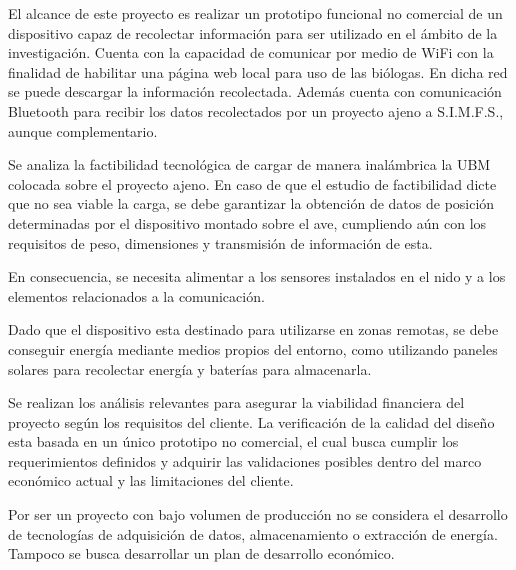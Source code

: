 El alcance de este proyecto es realizar un prototipo funcional no comercial de un dispositivo capaz de recolectar información para ser utilizado en el ámbito de la investigación. Cuenta con la capacidad de comunicar por medio de WiFi con la finalidad de habilitar una página web local para uso de las biólogas. En dicha red se puede descargar la información recolectada. Además cuenta con comunicación Bluetooth para recibir los datos recolectados por un proyecto ajeno a S.I.M.F.S., aunque complementario.

Se analiza la factibilidad tecnológica de cargar de manera inalámbrica la UBM colocada sobre el proyecto ajeno. En caso de que el estudio de factibilidad dicte que no sea viable la carga, se debe garantizar la obtención de datos de posición determinadas por el dispositivo montado sobre el ave, cumpliendo aún con los requisitos de peso, dimensiones y transmisión de información de esta.

En consecuencia, se necesita alimentar a los sensores instalados en el nido y a los elementos relacionados a la comunicación.

Dado que el dispositivo esta destinado para utilizarse en zonas remotas, se debe conseguir energía mediante medios propios del entorno, como utilizando paneles solares para recolectar energía y baterías para almacenarla.

Se realizan los análisis relevantes para asegurar la viabilidad financiera del proyecto según los requisitos del cliente. La verificación de la calidad del diseño esta basada en un único prototipo no comercial, el cual busca cumplir los requerimientos definidos y adquirir las validaciones posibles dentro del marco económico actual y las limitaciones del cliente. 

Por ser un proyecto con bajo volumen de producción no se considera el desarrollo de tecnologías de adquisición de datos, almacenamiento o extracción de energía. Tampoco se busca desarrollar un plan de desarrollo económico.